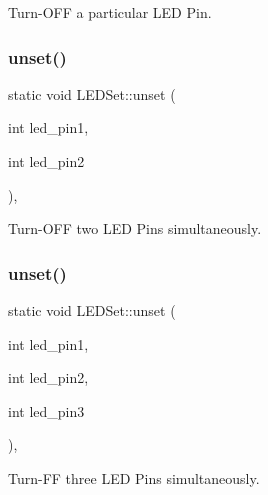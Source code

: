 Turn-\/\+O\+FF a particular L\+ED Pin. 

\mbox{\label{classLEDSet_abf0914e193e85bf172455fa55049bd09}} 
\subsubsection{\texorpdfstring{unset()}{unset()}\hspace{0.1cm}{\footnotesize\ttfamily [2/3]}}
{\footnotesize\ttfamily static void L\+E\+D\+Set\+::unset (\begin{DoxyParamCaption}\item[{int}]{led\+\_\+pin1,  }\item[{int}]{led\+\_\+pin2 }\end{DoxyParamCaption})\hspace{0.3cm}{\ttfamily [inline]}, {\ttfamily [static]}}



Turn-\/\+O\+FF two L\+ED Pins simultaneously. 

\mbox{\label{classLEDSet_a021ebbfef0fa17171d6b4e47c32e78b5}} 
\subsubsection{\texorpdfstring{unset()}{unset()}\hspace{0.1cm}{\footnotesize\ttfamily [3/3]}}
{\footnotesize\ttfamily static void L\+E\+D\+Set\+::unset (\begin{DoxyParamCaption}\item[{int}]{led\+\_\+pin1,  }\item[{int}]{led\+\_\+pin2,  }\item[{int}]{led\+\_\+pin3 }\end{DoxyParamCaption})\hspace{0.3cm}{\ttfamily [inline]}, {\ttfamily [static]}}



Turn-\/\+FF three L\+ED Pins simultaneously. 

\mbox{\label{classLEDSet_a127aca2f0cb95c1776622caa299437c9}} 
